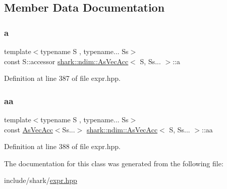 \subsection{Member Data Documentation}
\hypertarget{classshark_1_1ndim_1_1_as_vec_acc_3_01_s_00_01_ss_8_8_8_01_4_aa23d501c29acbde8ff8d9e2c72bb4756}{}\label{classshark_1_1ndim_1_1_as_vec_acc_3_01_s_00_01_ss_8_8_8_01_4_aa23d501c29acbde8ff8d9e2c72bb4756} 
\subsubsection{\texorpdfstring{a}{a}}
{\footnotesize\ttfamily template$<$typename S , typename... Ss$>$ \\
const S\+::accessor \hyperlink{classshark_1_1ndim_1_1_as_vec_acc}{shark\+::ndim\+::\+As\+Vec\+Acc}$<$ S, Ss... $>$\+::a\hspace{0.3cm}{\ttfamily [private]}}



Definition at line 387 of file expr.\+hpp.

\hypertarget{classshark_1_1ndim_1_1_as_vec_acc_3_01_s_00_01_ss_8_8_8_01_4_ab43adccf8b6c612647ae7a9986dad9e2}{}\label{classshark_1_1ndim_1_1_as_vec_acc_3_01_s_00_01_ss_8_8_8_01_4_ab43adccf8b6c612647ae7a9986dad9e2} 
\subsubsection{\texorpdfstring{aa}{aa}}
{\footnotesize\ttfamily template$<$typename S , typename... Ss$>$ \\
const \hyperlink{classshark_1_1ndim_1_1_as_vec_acc}{As\+Vec\+Acc}$<$Ss...$>$ \hyperlink{classshark_1_1ndim_1_1_as_vec_acc}{shark\+::ndim\+::\+As\+Vec\+Acc}$<$ S, Ss... $>$\+::aa\hspace{0.3cm}{\ttfamily [private]}}



Definition at line 388 of file expr.\+hpp.



The documentation for this class was generated from the following file\+:\begin{DoxyCompactItemize}
\item 
include/shark/\hyperlink{expr_8hpp}{expr.\+hpp}\end{DoxyCompactItemize}

